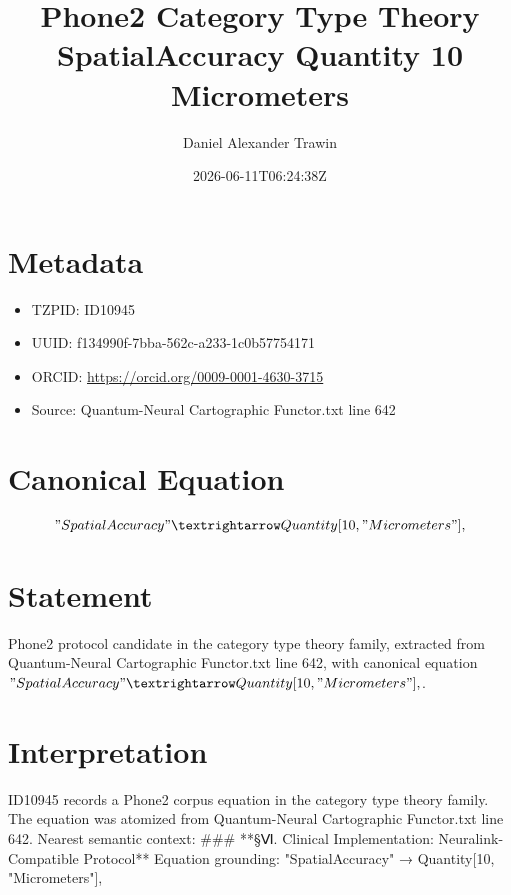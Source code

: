\documentclass[11pt]{article}
\title{Phone2 Category Type Theory SpatialAccuracy Quantity 10 Micrometers}
\author{Daniel Alexander Trawin}
\date{2026-06-11T06:24:38Z}
\begin{document}
\maketitle
\section*{Metadata}
\begin{itemize}
\item TZPID: ID10945
\item UUID: f134990f-7bba-562c-a233-1c0b57754171
\item ORCID: \url{https://orcid.org/0009-0001-4630-3715}
\item Source: Quantum-Neural Cartographic Functor.txt line 642
\end{itemize}
\section*{Canonical Equation}
\[
"SpatialAccuracy" → Quantity[10, "Micrometers"],
\]
\section*{Statement}
Phone2 protocol candidate in the category type theory family, extracted from Quantum-Neural Cartographic Functor.txt line 642, with canonical equation $"SpatialAccuracy" → Quantity[10, "Micrometers"],$.
\section*{Interpretation}
ID10945 records a Phone2 corpus equation in the category type theory family. The equation was atomized from Quantum-Neural Cartographic Functor.txt line 642. Nearest semantic context: ### **§Ⅵ. Clinical Implementation: Neuralink-Compatible Protocol** Equation grounding: "SpatialAccuracy" → Quantity[10, "Micrometers"],
\end{document}
